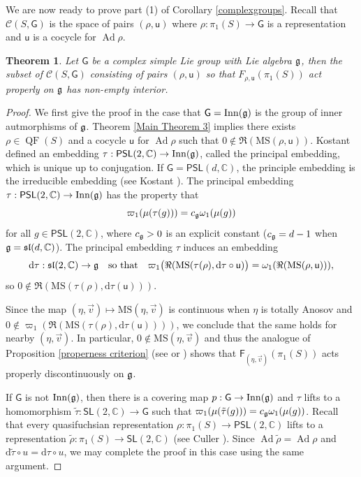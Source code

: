\documentclass{amsart}
\theoremstyle{plain}
\newtheorem{theorem}[proposition]{Theorem}
\theoremstyle{definition}
\theoremstyle{remark}
\newcommand{\Ad}{\operatorname{Ad}}
\newcommand{\QF}{\operatorname{QF}}
\newcommand{\PSL}{\mathsf{PSL}}
\newcommand{\SL}{\mathsf{SL}}
\newcommand{\aff}[1]{\sf{F}_{#1}}
\renewcommand{\sf}[1]{{\mathsf{#1}}}
\newcommand{\C}{\mathbb C}
\renewcommand{\sl}{\mathfrak{sl}}
\newcommand{\<}{\left <}
\renewcommand{\>}{\right >}
\newcommand{\M}{\mathrm{MS}}
\newcommand{\co}{\sf u}
\renewcommand{\C}{\mathbb C}
\newcommand{\dd}{{\mathrm{d}}}
\begin{document}
We are now ready to prove part (1) of Corollary \ref{complexgroups}. Recall that $\mathcal C(S,\sf G)$ is the space of pairs $(\rho,\co)$ where
$\rho:\pi_1(S)\to\sf G$ is a representation and $\co $ is a cocycle for $\Ad\rho$.

\begin{theorem}\label{complexgroups1} Let $\sf G$ be a complex simple Lie group with Lie algebra $\frak g$, then the
subset of $\mathcal C(S,\sf G)$  consisting of pairs $(\rho,\co)$
so that $F_{\rho,\co}(\pi_1(S))$ act properly on  $\frak g$ has non-empty interior.
\end{theorem}


\begin{proof}
We first give the proof in the case that $\sf G=\mathrm{Inn}(\frak g)$ is the group of inner autmorphisms of $\frak g$.
Theorem \ref{Main Theorem 3} implies there exists $\rho\in \QF(S)$ and a cocycle $\co$ for $\Ad\rho$
such that $0\notin\Re(\M(\rho,\co)).$  
Kostant defined an embedding $\tau:\PSL(2,\C)\to\mathrm{Inn}(\frak g)$,  called the principal embedding, which is unique up to conjugation.
If $\sf G = \PSL(d,\C)$, the principle embedding is the irreducible embedding (see Kostant \cite{Kostant}).  
The principal embedding $\tau:\PSL(2,\C)\to\mathrm{Inn}(\frak g)$  has the property that  
 $$\varpi_1(\mu(\tau(g))) = c_{\frak g} \omega_1(\mu(g))$$
 for all $g\in\PSL(2,\C)$,
where $c_{\frak g}>0$ is an explicit constant ($c_\frak g=d-1$ when $\frak g=\sl(d,\C)$).
The principal embedding $\tau$ induces an embedding 
$$\mathrm d\tau:\sl(2,\C)\to\frak g\quad\text{so that}\quad
\varpi_1\big(\Re(\M(\tau(\rho),\dd\tau\circ\co)\big)=\omega_1( \Re(\M(\rho,\co))),$$
so $0\notin\Re(\M(\tau(\rho),\dd\tau(\co))).$

Since the map $(\eta,{\vec v})\mapsto \M(\eta,{\vec v})$ is continuous when $\eta$ is totally Anosov 
and $0\notin\varpi_1(\Re(\M(\tau(\rho),\dd\tau(\co))))$, we conclude that the same holds for nearby $(\eta,{\vec v}).$ 
In particular, $0\notin\M(\eta,{\vec v})$ and thus the analogue of  Proposition \ref{properness criterion}  (see \cite{KS} or \cite[Prop. 7.2]{sambarino})
shows that $\aff{(\eta,\vec v)}(\pi_1(S))$ acts properly discontinuously on $\frak g$.

If $\sf G$ is not $\mathrm{Inn}(\frak g)$, then there is a covering map $p:\sf G\to \mathrm{Inn}(\frak g)$ and $\tau$ lifts to a
homomorphism $\tilde \tau:\SL(2,\C)\to \sf G$ such that  $\varpi_1(\mu(\tilde\tau(g))) = c_{\frak g} \omega_1(\mu(g))$.
Recall that every quasifuchsian representation
$\rho:\pi_1(S)\to\PSL(2,\C)$ lifts to a representation \hbox{$\tilde \rho:\pi_1(S)\to\SL(2,\C)$} (see Culler \cite{culler}).
Since $\Ad\tilde\rho=\Ad\rho$ and $\mathrm d\tilde\tau \circ u=\mathrm d\tau\circ u$,
we may complete the proof in this case using the same argument.
 \end{proof}
 
\end{document}
